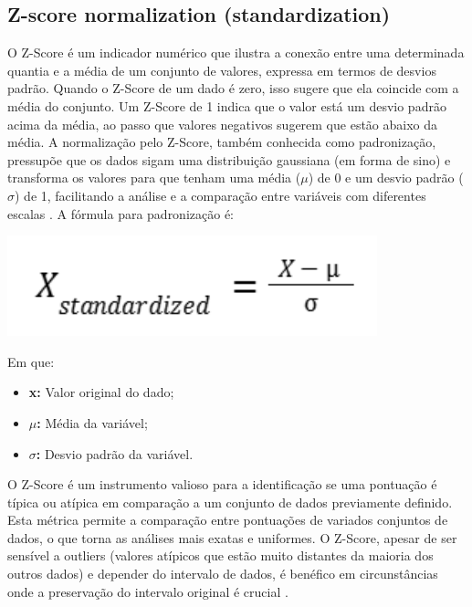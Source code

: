 \begin{apendicesenv}
\chapter{Z-score normalization (standardization)}
\label{apendice:zscore}


O Z-Score é um indicador numérico que ilustra a conexão entre uma determinada quantia e a média de um conjunto de valores, expressa em termos de desvios padrão. Quando o Z-Score de um dado é zero, isso sugere que ela coincide com a média do conjunto. Um Z-Score de 1 indica que o valor está um desvio padrão acima da média, ao passo que valores negativos sugerem que estão abaixo da média. A normalização pelo Z-Score, também conhecida como padronização, pressupõe que os dados sigam uma distribuição gaussiana (em forma de sino) e transforma os valores para que tenham uma média (\(\mu\)) de 0 e um desvio padrão (\(\sigma\)) de 1, facilitando a análise e a comparação entre variáveis com diferentes escalas \cite{jaiswal2024, maiseretorno2022}. A fórmula para padronização é:

\begin{center}
  \includegraphics[scale=0.8]{figuras/Z-Score.pdf}
\end{center}


Em que:
\begin{itemize}
  \item \textbf{x:} Valor original do dado;
  \item \textbf{\(\mu\):} Média da variável;
  \item \textbf{\(\sigma\):} Desvio padrão da variável.
\end{itemize}

O Z-Score é um instrumento valioso para a identificação se uma pontuação é típica ou atípica em comparação a um conjunto de dados previamente definido. Esta métrica permite a comparação entre pontuações de variados conjuntos de dados, o que torna as análises mais exatas e uniformes. O Z-Score, apesar de ser sensível a outliers (valores atípicos que estão muito distantes da maioria dos outros dados) e depender do intervalo de dados, é benéfico em circunstâncias onde a preservação do intervalo original é crucial \cite{sousa2019, maiseretorno2022}.


\end{apendicesenv}

